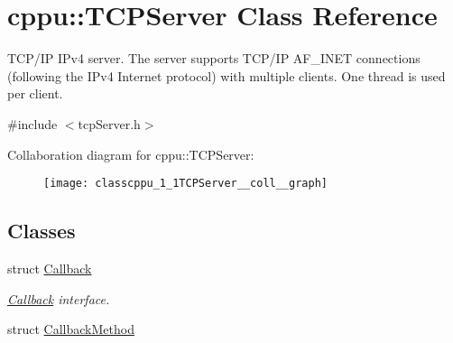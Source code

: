 \hypertarget{classcppu_1_1TCPServer}{}\section{cppu\+:\+:T\+C\+P\+Server Class Reference}
\label{classcppu_1_1TCPServer}


T\+C\+P/\+I\+P I\+Pv4 server. The server supports T\+C\+P/\+I\+P A\+F\+\_\+\+I\+N\+E\+T connections (following the I\+Pv4 Internet protocol) with multiple clients. One thread is used per client.  




{\ttfamily \#include $<$tcp\+Server.\+h$>$}



Collaboration diagram for cppu\+:\+:T\+C\+P\+Server\+:
\nopagebreak
\begin{figure}[H]
\begin{center}
\leavevmode
\texttt{[image: classcppu\_1\_1TCPServer\_\_coll\_\_graph]}
\end{center}
\end{figure}
\subsection*{Classes}
\begin{DoxyCompactItemize}
\item 
struct \hyperlink{structcppu_1_1TCPServer_1_1Callback}{Callback}
\begin{DoxyCompactList}\small\item\em \hyperlink{structcppu_1_1TCPServer_1_1Callback}{Callback} interface. \end{DoxyCompactList}\item 
struct \hyperlink{structcppu_1_1TCPServer_1_1CallbackMethod}{Callback\+Method}
\end{DoxyCompactItemize}
